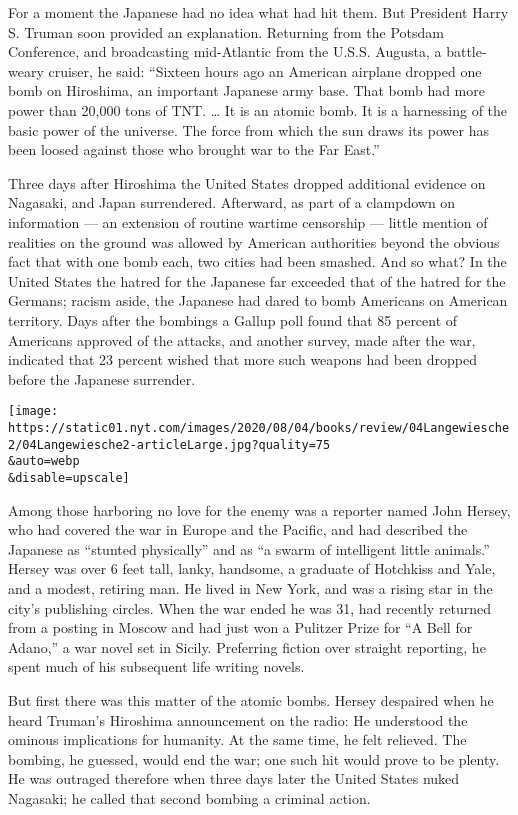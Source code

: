 For a moment the Japanese had no idea what had hit them. But President
Harry S. Truman soon provided an explanation. Returning from the Potsdam
Conference, and broadcasting mid-Atlantic from the U.S.S. Augusta, a
battle-weary cruiser, he said: ``Sixteen hours ago an American airplane
dropped one bomb on Hiroshima, an important Japanese army base. That
bomb had more power than 20,000 tons of TNT. \ldots{} It is an atomic
bomb. It is a harnessing of the basic power of the universe. The force
from which the sun draws its power has been loosed against those who
brought war to the Far East.''

Three days after Hiroshima the United States dropped additional evidence
on Nagasaki, and Japan surrendered. Afterward, as part of a clampdown on
information --- an extension of routine wartime censorship --- little
mention of realities on the ground was allowed by American authorities
beyond the obvious fact that with one bomb each, two cities had been
smashed. And so what? In the United States the hatred for the Japanese
far exceeded that of the hatred for the Germans; racism aside, the
Japanese had dared to bomb Americans on American territory. Days after
the bombings a Gallup poll found that 85 percent of Americans approved
of the attacks, and another survey, made after the war, indicated that
23 percent wished that more such weapons had been dropped before the
Japanese surrender.

\texttt{[image: https://static01.nyt.com/images/2020/08/04/books/review/04Langewiesche2/04Langewiesche2-articleLarge.jpg?quality=75\\\&auto=webp\\\&disable=upscale]}

Among those harboring no love for the enemy was a reporter named John
Hersey, who had covered the war in Europe and the Pacific, and had
described the Japanese as ``stunted physically'' and as ``a swarm of
intelligent little animals.'' Hersey was over 6 feet tall, lanky,
handsome, a graduate of Hotchkiss and Yale, and a modest, retiring man.
He lived in New York, and was a rising star in the city's publishing
circles. When the war ended he was 31, had recently returned from a
posting in Moscow and had just won a Pulitzer Prize for ``A Bell for
Adano,'' a war novel set in Sicily. Preferring fiction over straight
reporting, he spent much of his subsequent life writing novels.

But first there was this matter of the atomic bombs. Hersey despaired
when he heard Truman's Hiroshima announcement on the radio: He
understood the ominous implications for humanity. At the same time, he
felt relieved. The bombing, he guessed, would end the war; one such hit
would prove to be plenty. He was outraged therefore when three days
later the United States nuked Nagasaki; he called that second bombing a
criminal action.

